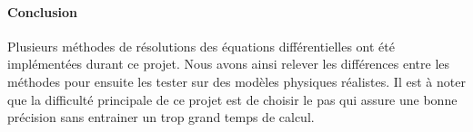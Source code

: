 \paragraph{Conclusion}


Plusieurs méthodes de résolutions des équations différentielles ont été implémentées durant ce projet.
Nous avons ainsi relever les différences entre les méthodes pour ensuite les tester sur des modèles physiques réalistes.
Il est à noter que la difficulté principale de ce projet est de choisir le pas qui assure une bonne précision sans entrainer un trop grand temps de calcul.